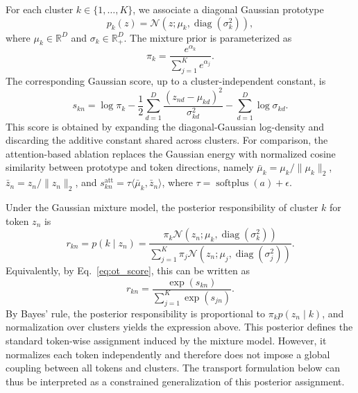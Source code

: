 \documentclass[journal]{IEEEtran}
\begin{document}
For each cluster \(k \in \{1,\dots,K\}\), we associate a diagonal Gaussian prototype
\begin{equation}
p_k(z) = \mathcal{N}(z; \mu_k, \operatorname{diag}(\sigma_k^2)),
\end{equation}
where \(\mu_k \in \mathbb{R}^D\) and \(\sigma_k \in \mathbb{R}_+^D\). The mixture prior is parameterized as
\begin{equation}
\pi_k = \frac{e^{\alpha_k}}{\sum_{j=1}^K e^{\alpha_j}}.
\end{equation}
The corresponding Gaussian score, up to a cluster-independent constant, is
\begin{equation}
s_{kn}
= \log \pi_k
-\frac{1}{2}\sum_{d=1}^D \frac{(z_{nd}-\mu_{kd})^2}{\sigma_{kd}^2}
-\sum_{d=1}^D \log \sigma_{kd}.
\label{eq:ot_score}
\end{equation}
This score is obtained by expanding the diagonal-Gaussian log-density and discarding the additive constant shared across clusters.
For comparison, the attention-based ablation replaces the Gaussian energy with normalized cosine similarity between prototype and token directions, namely \(\bar{\mu}_k = \mu_k / \|\mu_k\|_2\), \(\bar{z}_n = z_n / \|z_n\|_2\), and \(s^{\mathrm{att}}_{kn} = \tau \langle \bar{\mu}_k, \bar{z}_n \rangle\), where \(\tau = \operatorname{softplus}(a) + \epsilon\).

Under the Gaussian mixture model, the posterior responsibility of cluster \(k\) for token \(z_n\) is
\begin{equation}
r_{kn} = p(k \mid z_n)
= \frac{\pi_k \mathcal{N}(z_n; \mu_k, \operatorname{diag}(\sigma_k^2))}{\sum_{j=1}^K \pi_j \mathcal{N}(z_n; \mu_j, \operatorname{diag}(\sigma_j^2))}.
\end{equation}
Equivalently, by Eq.~\eqref{eq:ot_score}, this can be written as
\begin{equation}
r_{kn} = \frac{\exp(s_{kn})}{\sum_{j=1}^K \exp(s_{jn})}.
\end{equation}
By Bayes' rule, the posterior responsibility is proportional to \(\pi_k p(z_n \mid k)\), and normalization over clusters yields the expression above.
This posterior defines the standard token-wise assignment induced by the mixture model. However, it normalizes each token independently and therefore does not impose a global coupling between all tokens and clusters. The transport formulation below can thus be interpreted as a constrained generalization of this posterior assignment.
\end{document}
